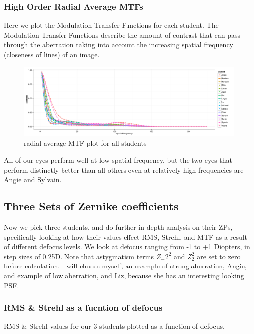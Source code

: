 \documentclass{article}
\begin{document}
\clearpage

\subsubsection{High Order Radial Average MTFs}
Here we plot the Modulation Transfer Functions for each student. The Modulation Transfer Functions describe the amount of contrast that can pass through the aberration taking into account the increasing spatial frequency (closeness of lines) of an image.

\begin{figure}[h]
  \centering
    \includegraphics[width=1\linewidth]{mtfs.pdf}
  \caption{radial average MTF plot for all students}
  \label{fig:mtfs}
\end{figure}

All of our eyes perform well at low spatial frequency, but the two eyes that perform distinctly better than all others even at relatively high frequencies are Angie and Sylvain.

\subsection{Three Sets of Zernike coefficients}
Now we pick three students, and do further in-depth analysis on their ZPs, specifically looking at how their values effect RMS, Strehl, and MTF as a result of different defocus levels. We look at defocus ranging from -1 to +1 Diopters, in step sizes of 0.25D. Note that astygmatism terms $Z_-2^2$ and $Z_2^2$ are set to zero before calculation. I will choose myself, an example of strong aberration, Angie, and example of low aberration, and Liz, because she has an interesting looking PSF.

\subsubsection{RMS \& Strehl as a fucntion of defocus}
RMS \& Strehl values for our 3 students plotted as a function of defocus. \
\end{document}
